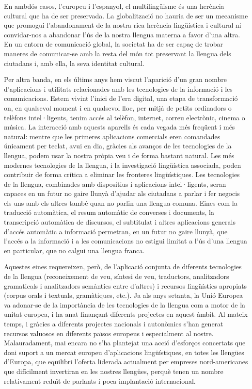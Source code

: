 \begin{multicols}{2}

En ambdós casos, l’europeu i l’espanyol, el multilingüisme és una herència cultural que ha de ser preservada. La globalització no hauria de ser un mecanisme que promogui l’abandonament de la nostra rica herència lingüística i cultural ni convidar-nos a abandonar l’ús de la nostra llengua materna a favor d’una altra. En un entorn de comunicació global, la societat ha de ser capaç de trobar maneres de comunicar-se amb la resta del món tot preservant la llengua dels ciutadans i, amb ella, la seva identitat cultural. 

Per altra banda, en els últims anys hem viscut l'aparició d'un gran nombre d'aplicacions i utilitats relacionades amb les tecnologies de la informació i les comunicacions. Estem vivint l’inici de l'era digital, una etapa de transformació on, en qualsevol moment i en qualsevol lloc, per mitjà de petits ordinadors o telèfons intel·ligents, tenim accés al telèfon, internet, correu electrònic, cinema o música. La interacció amb aquests aparells és cada vegada més freqüent i més natural: mentre que les primeres aplicacions comercials eren comandades únicament per teclat, avui en dia, gràcies als avanços de les tecnologies de la llengua, podem usar la nostra pròpia veu i de forma bastant natural. Les més modernes tecnologies de la llengua, i la investigació lingüística associada, poden contribuir de forma crítica a eliminar les fronteres lingüístiques. Les tecnologies de la llengua, combinades amb dispositius i aplicacions intel·ligents, seran capaces en un futur no gaire llunyà d’ajudar als ciutadans a parlar i fer negocis els uns amb els altres també quan no parlin una llengua comuna. Eines com la traducció automàtica, el resum automàtic de converses i documents, la transcripció automàtica de discursos, el subtitulat i altres aplicacions generals d'accés automàtic a informació permetran, en un futur no gaire llunyà, que l'accés a la informació i a les comunicacions no estigui limitat a l'ús d'una llengua en particular, que no calgui una llengua franca.

Aquestes eines requereixen, però, de l'aplicació conjunta de diferents tecnologies de la llengua (reconeixement de veu, síntesi de veu, traductors, analitzadors gramaticals i analitzadors semàntics entre d'altres) i recursos lingüístics apropiats (corpus orals i textuals, gramàtiques, etc.). Ja als anys setanta, la Unió Europea va adonar-se de la importància de les tecnologies de la llengua com a motor de la unitat europea, i ha anat finançant diferents projectes en aquest àmbit. Al mateix temps, i gràcies a diferents projectes nacionals i autonòmics s’han generat recursos valuosos en diferents països europeus i especialment al nostre. Malauradament, mai encara no s’ha plantejat una acció d’esforços concertats que doni suport a un mercat europeu d’aplicacions lingüístiques, en totes les llengües d’Europa, que equilibri l’oferta liderada actualment per empreses nord-americanes que difícilment invertiran en les nostres llengües, perquè tenen un nombre relativament reduït de parlants i poca implantació internacional. 


\end{multicols}
